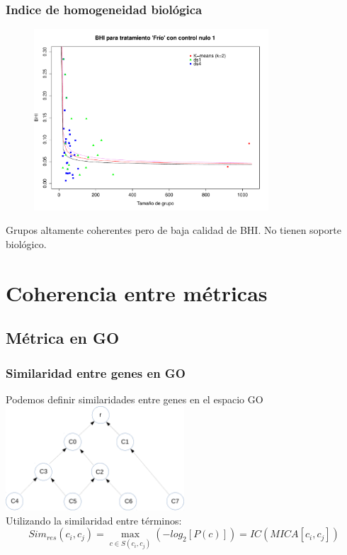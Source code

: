 \documentclass[serif,9pt, t]{beamer}
\newcommand\Fontvi{\fontsize{7}{7.2}\selectfont}
\begin{document}
\begin{frame}\frametitle{Indice de homogeneidad biológica} 
\begin{figure}
    	\centering
	\includegraphics[width=0.78\textwidth]{bhi_km_ds1_ds4_control1.pdf}
\end{figure}
\Fontvi
\centering
Grupos altamente coherentes pero de baja calidad de BHI. No tienen soporte biológico.
\end{frame}

\section{Coherencia entre métricas}

\subsection{Métrica en GO}
\begin{frame}\frametitle{Similaridad entre genes en GO}
\centering
Podemos definir similaridades entre genes en el espacio GO\\
\bigskip
\includegraphics[width=0.5\textwidth]{dag.pdf}
\\\bigskip
Utilizando la similaridad entre términos:
\begin{equation}
	Sim_{res}(c_i, c_j) = \max\limits_{c \in S(c_i, c_j)}(-log_2[P(c)]) = IC(MICA[c_i, c_j])
\end{equation}
\end{frame}
\end{document}
